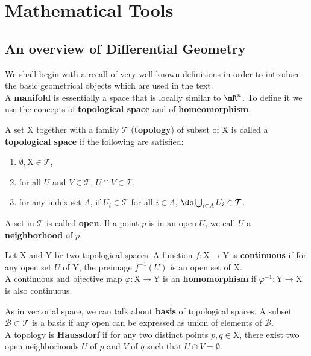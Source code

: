 \chapter{Mathematical Tools}
\label{chapter1}

\section{An overview of Differential Geometry}
We shall begin with a recall of very well known definitions in order to introduce the basic geometrical objects which are used in the text.\\

A \textbf{manifold} is essentially a space that is locally similar to $\mR^n$. To define it we use the concepts of \textbf{topological space} and of \textbf{homeomorphism}.
\begin{definition}
	A set $\mathrm{X}$ together with a family $\mathcal{T}$ (\textbf{topology}) of subset of $\mathrm{X}$ is called a \textbf{topological space} if the following are satisfied:
	\begin{enumerate}[label=\alph*. ]
		\item $\emptyset,\mathrm{X}\in\mathcal{T}$,
		\item for all $U$ and $V\in\mathcal{T}$, $U\cap V\in\mathcal{T}$,
		\item for any index set $A$, if $U_i\in\mathcal{T}$ for all $i\in A$, $\ds \bigcup_{i\in A} U_i\in\mathcal{T}$.
	\end{enumerate}
	A set in $\mathcal{T}$ is called \textbf{open}. If a point $p$ is in an open $U$, we call $U$ a \textbf{neighborhood} of $p$.
\end{definition}

\begin{definition}
	Let $\mathrm{X}$ and $\mathrm{Y}$ be two topological spaces. A function $f:\mathrm{X}\to\mathrm{Y}$ is \textbf{continuous} if for any open set $U$ of $\mathrm{Y}$, the preimage $f^{-1}(U)$ is an open set of $\mathrm{X}$.\\
	A continuous and bijective map $\varphi:\mathrm{X}\to\mathrm{Y}$ is an \textbf{homomorphism} if $\varphi^{-1}:\mathrm{Y}\to\mathrm{X}$ is also continuous.
\end{definition}
As in vectorial space, we can talk about \textbf{basis} of topological spaces. A subset $\mathcal{B}\subset\mathcal{T}$ is a basis if any open can be expressed as union of elements of $\mathcal{B}$.\\
A topology is \textbf{Haussdorf} if for any two distinct points $p,q\in\mathrm{X}$, there exist two open neighborhoods $U$ of $p$ and $V$ of $q$ such that $U\cap V=\emptyset$.\\


